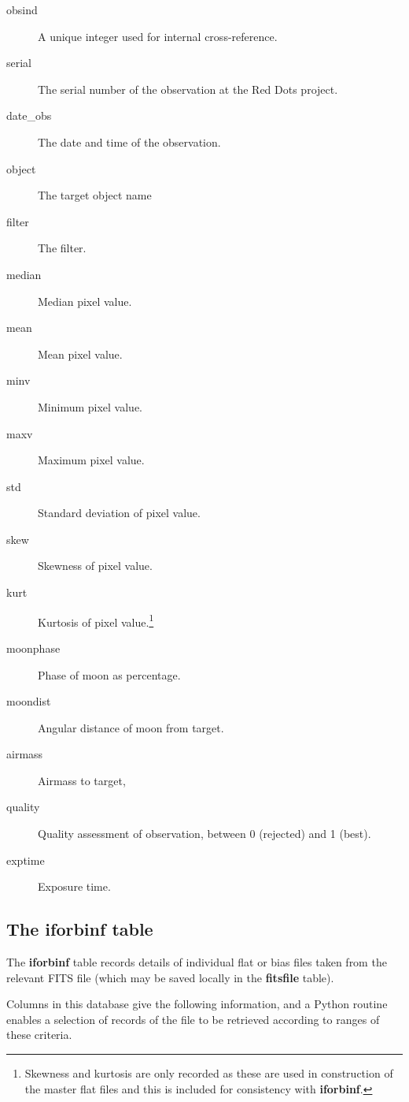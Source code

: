 \begin{description}
\item[obsind] A unique integer used for internal cross-reference.
\item[serial] The serial number of the observation at the Red Dots project.
\item[date\_obs] The date and time of the observation.
\item[object] The target object name
\item[filter] The filter.
\item[median] Median pixel value.
\item[mean] Mean pixel value.
\item[minv] Minimum pixel value.
\item[maxv] Maximum pixel value.
\item[std] Standard deviation of pixel value.
\item[skew] Skewness of pixel value.
\item[kurt] Kurtosis of pixel value.\footnote{Skewness and kurtosis are only
recorded as these are used in construction of the master flat files and this is
included for consistency with \textbf{iforbinf}.}
\item[moonphase] Phase of moon as percentage.
\item[moondist] Angular distance of moon from target.
\item[airmass] Airmass to target,
\item[quality] Quality assessment of observation, between 0 (rejected) and 1
(best).
\item[exptime] Exposure time.
\end{description}

\subsection{The iforbinf table}
\protect\label{section:iforbinftable}

The \textbf{iforbinf} table records details of individual flat or bias files
taken from the relevant FITS file (which may be saved locally in the \textbf{fitsfile} table).

Columns in this database give the following information, and a Python routine
enables a selection of records of the file to be retrieved according to
ranges of these criteria.

